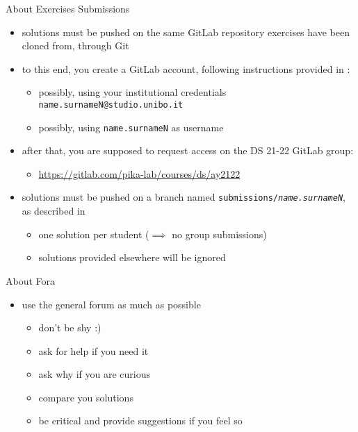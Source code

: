 \documentclass[presentation]{beamer}\mode<presentation>{\usetheme{AMSBolognaFC}}
\begin{document}
\begin{frame}[c]{About Exercises Submissions}

    \begin{itemize}
        \item solutions must be pushed on the same GitLab repository exercises have been cloned from, \alert{through Git}

        \vfill

        \item to this end, you create a GitLab account, following instructions provided in \cite{envSetup}:
        \begin{itemize}
            \item possibly, using your institutional credentials \texttt{\alert{name.surnameN}@studio.unibo.it}
            \item possibly, using \texttt{\alert{name.surnameN}} as username
        \end{itemize}

        \vfill

        \item after that, you are supposed to request access on the DS 21-22 GitLab group:
        \begin{itemize}
            \item \url{https://gitlab.com/pika-lab/courses/ds/ay2122}
        \end{itemize}

        \vfill

        \item solutions must be pushed on a branch named \alert{\texttt{submissions/\textit{name.surnameN}}}, as described in \cite{envSetup}
        \begin{itemize}
            \item one solution per student ($\implies$ no group submissions)
            \item solutions provided elsewhere will be ignored
        \end{itemize}
    \end{itemize}
\end{frame}

\begin{frame}[c]{About Fora}
    \begin{itemize}
        \item use the general forum as much as possible\\
        \begin{itemize}
            \item don't be shy :)
            \item ask for help if you need it
            \item ask why if you are curious
            \item compare you solutions
            \item be critical and provide suggestions if you feel so
        \end{itemize}
    \end{itemize}
\end{frame}
\end{document}
